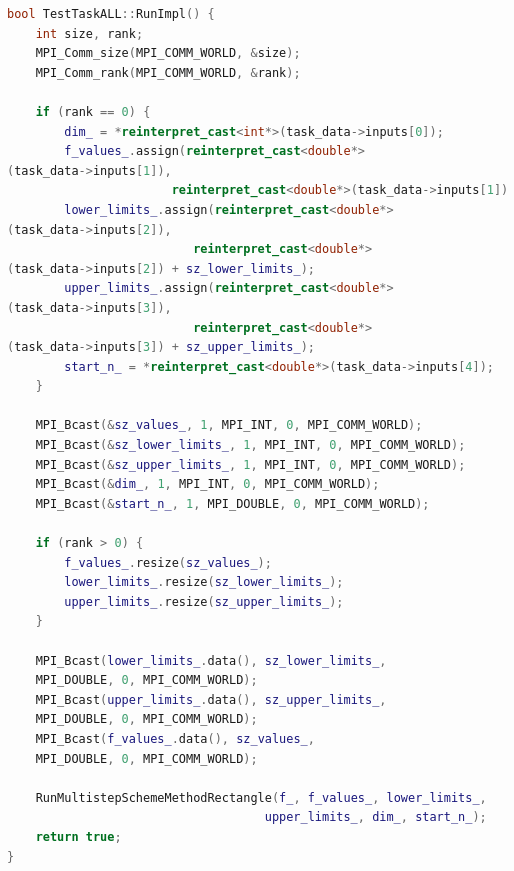\documentclass[14pt,a4paper]{article}
\begin{document}
\begin{framed}
\begin{lstlisting}[language=C++]
bool TestTaskALL::RunImpl() {
    int size, rank;
    MPI_Comm_size(MPI_COMM_WORLD, &size);
    MPI_Comm_rank(MPI_COMM_WORLD, &rank);

    if (rank == 0) {
        dim_ = *reinterpret_cast<int*>(task_data->inputs[0]);
        f_values_.assign(reinterpret_cast<double*>
(task_data->inputs[1]),
                       reinterpret_cast<double*>(task_data->inputs[1]) + sz_values_);
        lower_limits_.assign(reinterpret_cast<double*>
(task_data->inputs[2]),
                          reinterpret_cast<double*>
(task_data->inputs[2]) + sz_lower_limits_);
        upper_limits_.assign(reinterpret_cast<double*>
(task_data->inputs[3]),
                          reinterpret_cast<double*>
(task_data->inputs[3]) + sz_upper_limits_);
        start_n_ = *reinterpret_cast<double*>(task_data->inputs[4]);
    }

    MPI_Bcast(&sz_values_, 1, MPI_INT, 0, MPI_COMM_WORLD);
    MPI_Bcast(&sz_lower_limits_, 1, MPI_INT, 0, MPI_COMM_WORLD);
    MPI_Bcast(&sz_upper_limits_, 1, MPI_INT, 0, MPI_COMM_WORLD);
    MPI_Bcast(&dim_, 1, MPI_INT, 0, MPI_COMM_WORLD);
    MPI_Bcast(&start_n_, 1, MPI_DOUBLE, 0, MPI_COMM_WORLD);

    if (rank > 0) {
        f_values_.resize(sz_values_);
        lower_limits_.resize(sz_lower_limits_);
        upper_limits_.resize(sz_upper_limits_);
    }

    MPI_Bcast(lower_limits_.data(), sz_lower_limits_,
    MPI_DOUBLE, 0, MPI_COMM_WORLD);
    MPI_Bcast(upper_limits_.data(), sz_upper_limits_, 
    MPI_DOUBLE, 0, MPI_COMM_WORLD);
    MPI_Bcast(f_values_.data(), sz_values_, 
    MPI_DOUBLE, 0, MPI_COMM_WORLD);

    RunMultistepSchemeMethodRectangle(f_, f_values_, lower_limits_,
                                    upper_limits_, dim_, start_n_);
    return true;
}
\end{lstlisting}
\end{framed}
\end{document}
